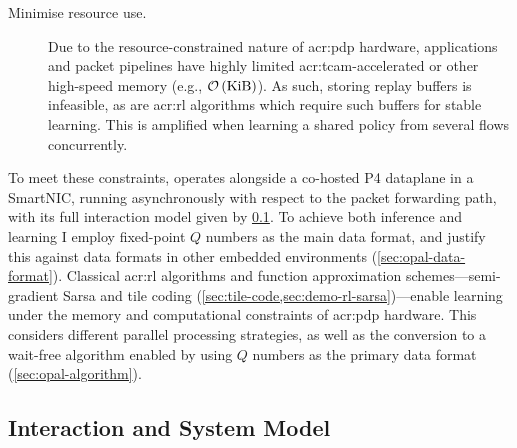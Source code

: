 \begin{description}
	\item[Minimise resource use.] Due to the resource-constrained nature of \gls{acr:pdp} hardware, applications and packet pipelines have highly limited \gls{acr:tcam}-accelerated or other high-speed memory (e.g., $\mathcal{O}\left(\unit{\kibi\byte}\right)$). As such, storing replay buffers is infeasible, as are \gls{acr:rl} algorithms which require such buffers for stable learning. This is amplified when learning a shared policy from several flows concurrently.
	
%	
\end{description}

To meet these constraints, \approachshort{} operates alongside a co-hosted P4 dataplane in a SmartNIC, running asynchronously with respect to the packet forwarding path, with its full interaction model given by \cref{sec:opal-sys-model}.
To achieve both inference and learning I employ fixed-point $Q$ numbers as the main data format, and justify this against data formats in other embedded environments (\cref{sec:opal-data-format}).
Classical \gls{acr:rl} algorithms and function approximation schemes---semi-gradient Sarsa and tile coding (\cref{sec:tile-code,sec:demo-rl-sarsa})---enable learning under the memory and computational constraints of \gls{acr:pdp} hardware. This considers different parallel processing strategies, as well as the conversion to a wait-free algorithm enabled by using $Q$ numbers as the primary data format (\cref{sec:opal-algorithm}).

\subsection{Interaction and System Model}\label{sec:opal-sys-model}

